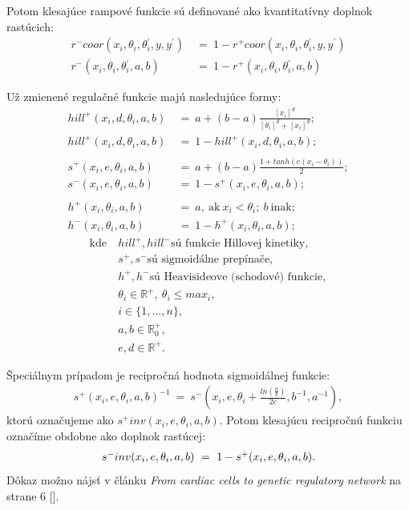 \documentclass[11pt,final,oneside]{fithesis}
\begin{document}
Potom klesaj\'uce rampov\'e funkcie s\'u definovan\'e ako kvantitat\'ivny doplnok rast\'ucich:
\begin{align*}
r^-coor (x_i,\theta{}_i,\theta{}_i^{'},y,y^{'}) &\ = \ 1 - r^+coor (x_i,\theta{}_i,\theta{}_i^{'},y,y^{'})\\
r^- (x_i, \theta{}_i, \theta{}_i^{'}, a,b) &\ = \ 1 - r^+ (x_i, \theta{}_i, \theta{}_i^{'}, a,b)
\end{align*}

U\v z zmienen\'e regula\v cn\'e funkcie maj\'u nasleduj\'uce formy:
\begin{align*}
hill^+(x_i, d, \theta_i, a, b) &\ = \ a + (b - a)\frac{[x_i]^d}{[\theta_i]^d + [x_i]^d};\\
hill^+(x_i, d, \theta_i, a, b) &\ = \ 1 - hill^+(x_i, d, \theta_i, a, b);\\
\\
s^+(x_i, e, \theta_i, a, b) &\ = \ a + (b - a)\frac{1 + tanh(e(x_i - \theta_i))}{2};\\
s^-(x_i, e, \theta_i, a, b) &\  = \ 1 - s^+(x_i, e, \theta_i, a, b);\\
\\
h^+(x_i,\theta_i,a,b) &\ = \ a,\ \textrm{ak}\ x_i < \theta_i;\ b\ \textrm{inak};\\
h^-(x_i,\theta_i,a,b) &\ = \ 1 - h^+(x_i,\theta_i,a,b);
\end{align*}
\begin{align*}
\textrm{kde}\ &hill^+, hill^- \textrm{s\'u funkcie Hillovej kinetiky,}\\
&s^+, s^- \textrm{s\'u sigmoid\'alne prep\'ina\v ce},\\
&h^+, h^- \textrm{s\'u Heavisideove (schodov\'e) funkcie},\\
&\theta_i \in \mathbb{R}^+, \ \theta_i \leq max_i,\\
&i \in \{1,\dots{},n\},\\
&a, b \in \mathbb{R}_0^+,\\
&e, d \in \mathbb{R}^+.
\end{align*}

\noindent\v Speci\'alnym pr\'ipadom je recipro\v cn\'a hodnota sigmoid\'alnej funkcie:
\begin{align*}
s^+(x_i, e, \theta_i, a, b)^{-1} \ = \ s^-(x_i, e, \theta_i + \frac{ln(\frac{a}{b})}{2e}, b^{-1}, a^{-1}),
\end{align*}
ktor\'u ozna\v cujeme ako $s^+inv(x_i, e, \theta_i, a, b)$. Potom klesaj\'ucu recipro\v cn\'u funkciu ozna\v c\'ime obdobne ako doplnok rast\'ucej:
\begin{align*}
\centerline{$s^-inv(x_i, e, \theta_i, a, b) \ = \ 1 - s^+(x_i, e, \theta_i, a, b)$.}
\end{align*}D\^ okaz mo\v zno n\'ajs\v t v \v cl\'anku \textit{From cardiac cells to genetic regulatory network} na strane 6 [].
\end{document}
